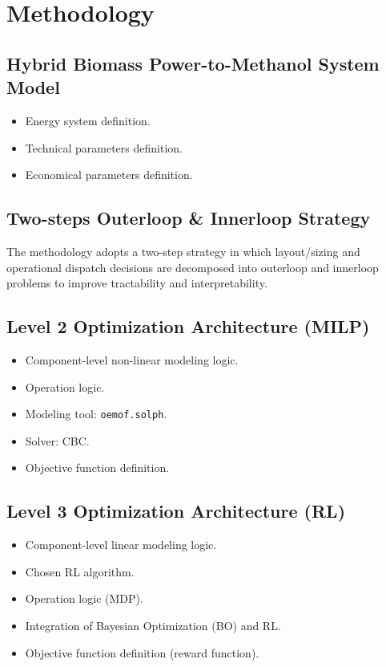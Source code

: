 ﻿%

\chapter{Methodology}
\label{ch:methodology}

\section{Hybrid Biomass Power-to-Methanol System Model}

\begin{itemize}
\item Energy system definition.
\item Technical parameters definition.
\item Economical parameters definition.
\end{itemize}

\section{Two-steps Outerloop \& Innerloop Strategy}

The methodology adopts a two-step strategy in which layout/sizing and operational dispatch decisions are decomposed into outerloop and innerloop problems to improve tractability and interpretability.

\section{Level 2 Optimization Architecture (MILP)}

\begin{itemize}
\item Component-level non-linear modeling logic.
\item Operation logic.
\item Modeling tool: \texttt{oemof.solph}.
\item Solver: CBC.
\item Objective function definition.
\end{itemize}

\section{Level 3 Optimization Architecture (RL)}

\begin{itemize}
\item Component-level linear modeling logic.
\item Chosen RL algorithm.
\item Operation logic (MDP).
\item Integration of Bayesian Optimization (BO) and RL.
\item Objective function definition (reward function).
\end{itemize}

